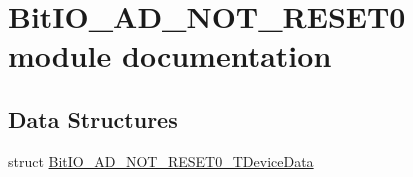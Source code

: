 \hypertarget{group___bit_i_o___a_d___n_o_t___r_e_s_e_t0__module}{\section{Bit\-I\-O\-\_\-\-A\-D\-\_\-\-N\-O\-T\-\_\-\-R\-E\-S\-E\-T0 module documentation}
\label{group___bit_i_o___a_d___n_o_t___r_e_s_e_t0__module}
}
\subsection*{Data Structures}
\begin{DoxyCompactItemize}
\item 
struct \hyperlink{struct_bit_i_o___a_d___n_o_t___r_e_s_e_t0___t_device_data}{Bit\-I\-O\-\_\-\-A\-D\-\_\-\-N\-O\-T\-\_\-\-R\-E\-S\-E\-T0\-\_\-\-T\-Device\-Data}
\end{DoxyCompactItemize}
